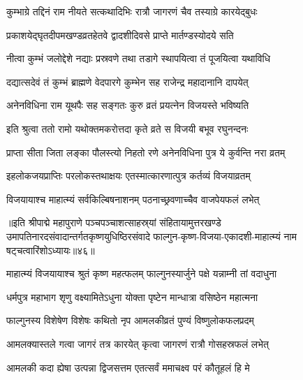 \twolineshloka
{कुम्भाग्रे तद्दिनं राम नीयते सत्कथादिभिः}
{रात्रौ जागरणं चैव तस्याग्रे कारयेद्बुधः}%

\twolineshloka
{प्रकाशयेद्घृतदीपमखण्डव्रतहेतवे}
{द्वादशीदिवसे प्राप्ते मार्तण्डस्योदये सति}%

\twolineshloka
{नीत्वा कुम्भं जलोद्देशे नद्याः प्रस्रवणे तथा}
{तडागे स्थापयित्वा तं पूजयित्वा यथाविधि}%

\twolineshloka
{दद्यात्सदेवं तं कुम्भं ब्राह्मणे वेदपारगे}
{कुम्भेन सह राजेन्द्र महादानानि दापयेत्}%

\twolineshloka
{अनेनविधिना राम यूथपैः सह सङ्गतः}
{कुरु व्रतं प्रयत्नेन विजयस्ते भविष्यति}%

\twolineshloka
{इति श्रुत्वा ततो रामो यथोक्तमकरोत्तदा}
{कृते व्रते स विजयी बभूव रघुनन्दनः}%

\twolineshloka
{प्राप्ता सीता जिता लङ्का पौलस्त्यो निहतो रणे}
{अनेनविधिना पुत्र ये कुर्वन्ति नरा व्रतम्}%

\twolineshloka
{इहलोकजयप्राप्तिः परलोकस्तथाक्षयः}
{एतस्मात्कारणात्पुत्र कर्तव्यं विजयाव्रतम्}%

\twolineshloka
{विजयायाश्च माहात्म्यं सर्वकिल्बिषनाशनम्}
{पठनाच्छ्रवणाच्चैव वाजपेयफलं लभेत्}%

॥इति श्रीपाद्मे महापुराणे पञ्चपञ्चाशत्साहस्र्यां संहितायामुत्तरखण्डे उमापतिनारदसंवादान्तर्गतकृष्णयुधिष्ठिरसंवादे फाल्गुन-कृष्ण-विजया-एकादशी-माहात्म्यं नाम षट्चत्वारिंशोऽध्यायः॥४६॥


\hyperref[sec:ekadashi_mahatmyam_padma_puranam]{\closesub}
\clearpage

\label{sec:padma-phalguna-shuklamalaki}



\twolineshloka
{माहात्म्यं विजयायाश्च श्रुतं कृष्ण महत्फलम्}
{फाल्गुनस्यार्जुने पक्षे यन्नाम्नी तां वदाधुना}%


\twolineshloka
{धर्मपुत्र महाभाग शृणु वक्ष्यामितेऽधुना}
{योक्ता पृष्टेन मान्धात्रा वसिष्ठेन महात्मना}%

\twolineshloka
{फाल्गुनस्य विशेषेण विशेषः कथितो नृप}
{आमलकीव्रतं पुण्यं विष्णुलोकफलप्रदम्}%

\twolineshloka
{आमलक्यास्तले गत्वा जागरं तत्र कारयेत्}
{कृत्वा जागरणं रात्रौ गोसहस्रफलं लभेत्}%


\twolineshloka
{आमलकी कदा ह्येषा उत्पन्ना द्विजसत्तम}
{एतत्सर्वं ममाचक्ष्व परं कौतूहलं हि मे}%

